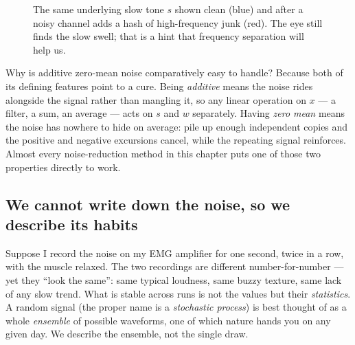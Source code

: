 \begin{figure}[H]
\centering
{}
\caption{The same underlying slow tone $s$ shown clean (blue) and
after a noisy channel adds a hash of high-frequency junk (red). The eye still
finds the slow swell; that is a hint that frequency separation will help us.}
\label{ch20:fig-sigplusnoise}
\end{figure}

\begin{intuitionbox}
Why is additive zero-mean noise comparatively easy to handle? Because both of its
defining features point to a cure. Being \emph{additive} means the noise rides
alongside the signal rather than mangling it, so any linear operation on
$x$ --- a filter, a sum, an average --- acts on $s$ and $w$ separately. Having \emph{zero
mean} means the noise has nowhere to hide on average: pile up enough
independent copies and the positive and negative excursions cancel, while the
repeating signal reinforces. Almost every noise-reduction method in this
chapter puts one of those two properties directly to work.
\end{intuitionbox}

\subsection{We cannot write down the noise, so we describe its habits}

Suppose I record the noise on my EMG amplifier for
one second, twice in a row, with the muscle relaxed. The two recordings are
different number-for-number --- yet they ``look the same'': same typical
loudness, same buzzy texture, same lack of any slow trend. What is stable across
runs is not the values but their \emph{statistics}. A random signal (the proper
name is a \emph{stochastic process}) is best thought of as a whole
\emph{ensemble} of possible waveforms, one of which nature hands you on any given
day. We describe the ensemble, not the single draw.

